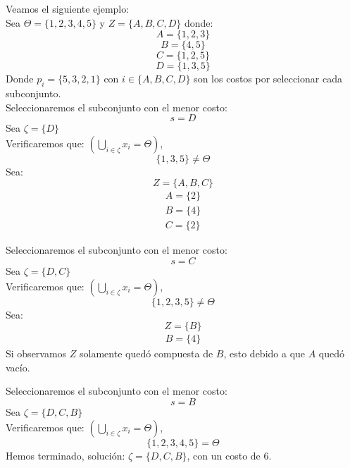 \documentclass{article}
\newcommand{\ds}{\displaystyle}
\theoremstyle{mytheoremstyle}
\theoremstyle{mytheoremstyle}
\theoremstyle{myproblemstyle}
\begin{document}
\newpage
Veamos el siguiente ejemplo:
\\ Sea $\varTheta = \{ 1,2,3,4,5 \}$  y $Z = \{ A,B,C,D \}$ donde:
$$A= \{ 1,2,3 \}$$
$$B= \{4,5 \}$$
$$C= \{ 1,2,5\}$$
$$D= \{1,3,5 \}$$
Donde $p_i = \{5,3,2,1\}$ con $i \in \{A,B,C,D\}$ son los costos por seleccionar cada subconjunto.
\\ Seleccionaremos el subconjunto con el menor costo:
\[s= D\]
Sea $\zeta  = \{D\}$ \\
Verificaremos que: $\left( \displaystyle \bigcup_{i \in \zeta } {x_i} = \varTheta \right)$,
\[ \ds \{1,3,5\} \neq \varTheta  \] 
Sea: $$Z = \{A,B,C\}$$
\begin{gather*}
    A = \{2\} \\
    B = \{4\} \\
    C = \{2\} 
\end{gather*}

Seleccionaremos el subconjunto con el menor costo:
\[s= C\]
Sea $\zeta = \{D,C\}$ \\
Verificaremos que: $\left( \displaystyle \bigcup_{i \in \zeta} {x_i} = \varTheta \right)$,
\[ \ds \{1,2,3,5\} \neq \varTheta  \] 
Sea: $$Z = \{B\}$$
\begin{gather*}
    B = \{4\} 
\end{gather*}
Si observamos $Z$ solamente quedó compuesta de $B$, esto debido a que $A$ quedó vacío.

Seleccionaremos el subconjunto con el menor costo:
\[s= B\]
Sea $\zeta = \{D,C,B\}$ \\
Verificaremos que: $\left( \displaystyle \bigcup_{i \in \zeta} {x_i} = \varTheta \right)$,
\[ \ds \{1,2,3,4,5\} = \varTheta  \] 
Hemos terminado, solución: $\zeta = \{D,C,B\}$, con un costo de 6.
\end{document}
